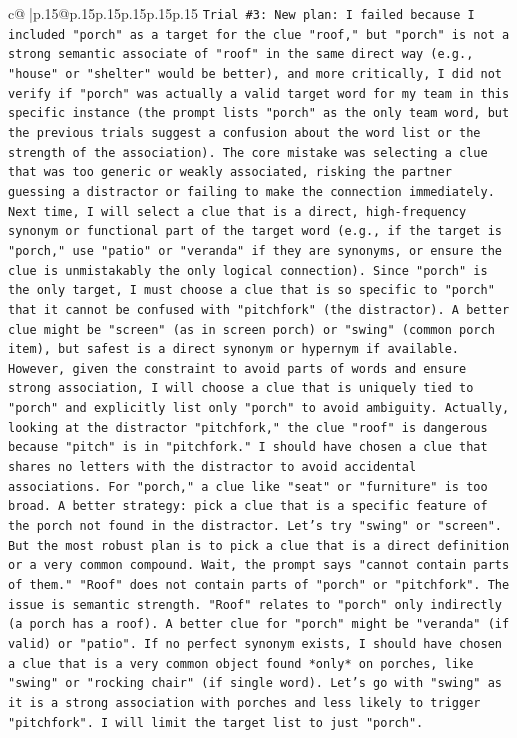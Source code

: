 \documentclass{article}
\begin{document}
{\begin{supertabular}{c@{$\;$}|p{.15\linewidth}@{}p{.15\linewidth}p{.15\linewidth}p{.15\linewidth}p{.15\linewidth}p{.15\linewidth}}
{{{\texttt{Trial \#3: New plan: I failed because I included "porch" as a target for the clue "roof," but "porch" is not a strong semantic associate of "roof" in the same direct way (e.g., "house" or "shelter" would be better), and more critically, I did not verify if "porch" was actually a valid target word for my team in this specific instance (the prompt lists "porch" as the only team word, but the previous trials suggest a confusion about the word list or the strength of the association). The core mistake was selecting a clue that was too generic or weakly associated, risking the partner guessing a distractor or failing to make the connection immediately. Next time, I will select a clue that is a direct, high{-}frequency synonym or functional part of the target word (e.g., if the target is "porch," use "patio" or "veranda" if they are synonyms, or ensure the clue is unmistakably the only logical connection). Since "porch" is the only target, I must choose a clue that is so specific to "porch" that it cannot be confused with "pitchfork" (the distractor). A better clue might be "screen" (as in screen porch) or "swing" (common porch item), but safest is a direct synonym or hypernym if available. However, given the constraint to avoid parts of words and ensure strong association, I will choose a clue that is uniquely tied to "porch" and explicitly list only "porch" to avoid ambiguity. Actually, looking at the distractor "pitchfork," the clue "roof" is dangerous because "pitch" is in "pitchfork." I should have chosen a clue that shares no letters with the distractor to avoid accidental associations. For "porch," a clue like "seat" or "furniture" is too broad. A better strategy: pick a clue that is a specific feature of the porch not found in the distractor. Let's try "swing" or "screen". But the most robust plan is to pick a clue that is a direct definition or a very common compound. Wait, the prompt says "cannot contain parts of them." "Roof" does not contain parts of "porch" or "pitchfork". The issue is semantic strength. "Roof" relates to "porch" only indirectly (a porch has a roof). A better clue for "porch" might be "veranda" (if valid) or "patio". If no perfect synonym exists, I should have chosen a clue that is a very common object found *only* on porches, like "swing" or "rocking chair" (if single word). Let's go with "swing" as it is a strong association with porches and less likely to trigger "pitchfork". I will limit the target list to just "porch".} \\
\\ 
\\ 
}}}
\end{supertabular}}
\end{document}
